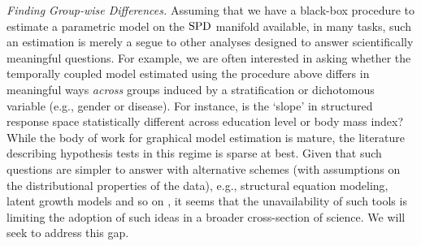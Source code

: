 {\em Finding Group-wise Differences.} Assuming that we have a black-box procedure to estimate a parametric model on the $\text{SPD}$ manifold available, 
in many tasks, such an estimation is merely a segue to other analyses designed to answer scientifically meaningful questions. 
For example, we are often interested in asking whether the temporally coupled model estimated using the procedure above differs 
in meaningful ways {\em across} groups induced by a stratification or dichotomous variable (e.g., gender or disease). For instance, is the `slope' in structured response space statistically different 
across education level or body mass index? 
While the body of work for graphical model estimation is mature, the literature describing hypothesis tests in this
regime \cite{diffnet,belilovsky2015hypothesis}
is sparse at best.
Given that such questions are simpler to answer with alternative schemes (with assumptions on the distributional properties of the data), e.g., structural equation modeling, 
latent growth models and so on \cite{ullman2003structural, mcardle2000introduction}, it seems that 
the unavailability of such tools is limiting the adoption of such ideas in a broader 
cross-section of science. We will seek to address this gap. 

